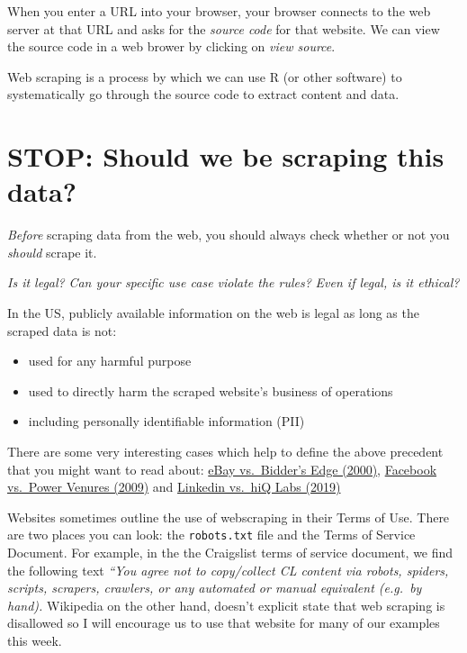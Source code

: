 \documentclass[
  letterpaper,
  DIV=11,
  numbers=noendperiod]{scrartcl}
\providecommand{\tightlist}{%
  \setlength{\itemsep}{0pt}\setlength{\parskip}{0pt}}\usepackage{longtable,booktabs,array}
\begin{document}
When you enter a URL into your browser, your browser connects to the web
server at that URL and asks for the \emph{source code} for that website.
We can view the source code in a web brower by clicking on \emph{view
source}.

Web scraping is a process by which we can use R (or other software) to
systematically go through the source code to extract content and data.

\hypertarget{stop-should-we-be-scraping-this-data}{%
\section{STOP: Should we be scraping this
data?}\label{stop-should-we-be-scraping-this-data}}

\emph{Before} scraping data from the web, you should always check
whether or not you \emph{should} scrape it.

\emph{Is it legal?} \emph{Can your specific use case violate the rules?}
\emph{Even if legal, is it ethical?}

In the US, publicly available information on the web is legal as long as
the scraped data is not:

\begin{itemize}
\tightlist
\item
  used for any harmful purpose
\item
  used to directly harm the scraped website's business of operations
\item
  including personally identifiable information (PII)
\end{itemize}

There are some very interesting cases which help to define the above
precedent that you might want to read about:
\href{https://en.wikipedia.org/wiki/EBay_v._Bidder\textquotesingle{}s_Edge\#Order}{eBay
vs.~Bidder's Edge (2000)},
\href{https://en.wikipedia.org/wiki/Facebook,_Inc._v._Power_Ventures,_Inc.\#Ruling}{Facebook
vs.~Power Venures (2009)} and
\href{https://en.wikipedia.org/wiki/HiQ_Labs_v._LinkedIn}{Linkedin
vs.~hiQ Labs (2019)}

Websites sometimes outline the use of webscraping in their Terms of Use.
There are two places you can look: the \texttt{robots.txt} file and the
Terms of Service Document. For example, in the the Craigslist terms of
service document, we find the following text \emph{``You agree not to
copy/collect CL content via robots, spiders, scripts, scrapers,
crawlers, or any automated or manual equivalent (e.g.~by hand).}
Wikipedia on the other hand, doesn't explicit state that web scraping is
disallowed so I will encourage us to use that website for many of our
examples this week.
\end{document}
